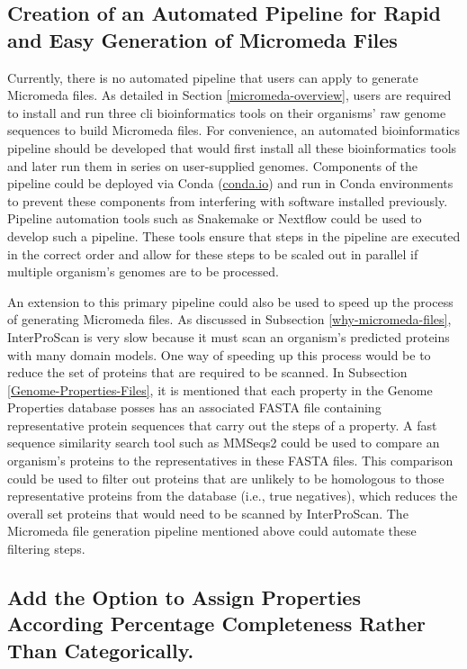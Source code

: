 \subsection{Creation of an Automated Pipeline for Rapid and Easy Generation of 
Micromeda Files} \label{pipeline-development}

Currently, there is no automated pipeline that users can apply to generate 
Micromeda files. As detailed in Section \ref{micromeda-overview}, users are 
required to install and run three \gls{cli} bioinformatics tools on their 
organisms' raw genome sequences to build Micromeda files. For convenience, an 
automated bioinformatics pipeline should be developed that would first install 
all these bioinformatics tools and later run them in series on user-supplied 
genomes. Components of the pipeline could be deployed via Conda 
(\href{http://conda.io}{conda.io}) and run in Conda environments to prevent 
these components from interfering with software installed previously. Pipeline 
automation tools such as Snakemake \cite{koster2012snakemake} or Nextflow 
\cite{di2017nextflow} could be used to develop such a pipeline. These tools 
ensure that steps in the pipeline are executed in the correct order and allow 
for these steps to be scaled out in parallel if multiple organism's genomes are 
to be processed.

An extension to this primary pipeline could also be used to speed up the process 
of generating Micromeda files. As discussed in Subsection 
\ref{why-micromeda-files}, InterProScan is very slow because it must scan an 
organism's predicted proteins with many domain models. One way of speeding up 
this process would be to reduce the set of proteins that are required to be 
scanned. In Subsection \ref{Genome-Properties-Files}, it is mentioned that each 
property in the Genome Properties database posses has an associated FASTA file 
containing representative protein sequences that carry out the steps of a 
property. A fast sequence similarity search tool such as MMSeqs2 
\cite{steinegger2017mmseqs2} could be used to compare an organism's proteins to 
the representatives in these FASTA files. This comparison could be used to 
filter out proteins that are unlikely to be homologous to those representative 
proteins from the database (i.e., true negatives), which reduces the overall set 
proteins that would need to be scanned by InterProScan. The Micromeda file 
generation pipeline mentioned above could automate these filtering steps.

\subsection{Add the Option to Assign Properties According Percentage 
Completeness Rather Than Categorically.}

